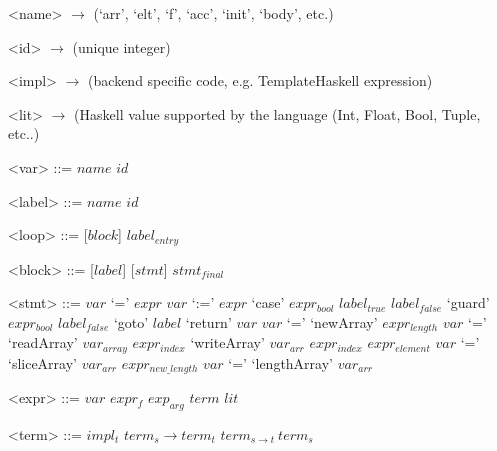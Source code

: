 
\setlength{\grammarindent}{5em} %
\renewcommand{\syntleft}{\normalfont\itshape} %
\renewcommand{\syntright}{}
\renewcommand{\litleft}{\ttfamily} %
\renewcommand{\litright}{}

\setlength{\grammarparsep}{0pt} %

\begin{grammar}
<name> $\rightarrow$ (`arr', `elt', `f', `acc', `init', `body', etc.)

<id>   $\rightarrow$ (unique integer\footnotemark)

<impl> $\rightarrow$ (backend specific code, e.g. TemplateHaskell expression)

<lit>  $\rightarrow$ (Haskell value supported by the language (Int, Float, Bool, Tuple, etc..)

<var>  ::= $name$ $id$

<label> ::= $name$ $id$

\end{grammar}

\setlength{\grammarparsep}{10pt plus 1pt minus 1pt} %
\begin{grammar}
<loop> ::= [$block$] $label_{entry}$

<block> ::= [$label$] [$stmt$] $stmt_{final}$

<stmt> ::= $var$ `=' $expr$
      \alt $var$ `:=' $expr$
      \alt `case' $expr_{bool}$ $label_{true}$ $label_{false}$
      \alt `guard' $expr_{bool}$ $label_{false}$
      \alt `goto' $label$
      \alt `return' $var$
      \alt $var$ `=' `newArray' $expr_{length}$
      \alt $var$ `=' `readArray' $var_{array}$ $expr_{index}$
      \alt `writeArray' $var_{arr}$ $expr_{index}$ $expr_{element}$
      \alt $var$ `=' `sliceArray' $var_{arr}$ $expr_{new\_length}$
      \alt $var$ `=' `lengthArray' $var_{arr}$

<expr> ::= $var$
      \alt $expr_{\mathit{f}}$ $exp_{arg}$
      \alt $term$
      \alt $lit$

<term> ::= $impl_{t}$
      \alt $term_{s} \rightarrow term_{t}$
      \alt $term_{s \rightarrow t}\ term_{s}$

\end{grammar}
